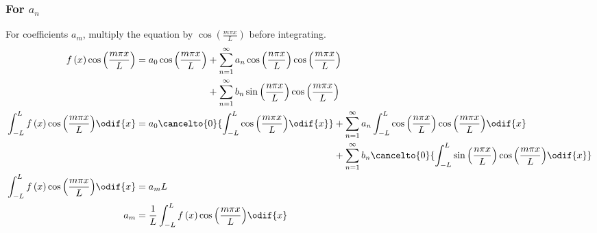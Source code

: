 \documentclass{article}
\begin{document}
\subsubsection{For \texorpdfstring{\(a_n\)}{an}}
For coefficients \(a_m\), multiply the equation by \(\cos{\left( \frac{m \pi x}{L} \right)}\) before integrating.
\begin{align*}
    f\left( x \right) \cos{\left( \frac{m \pi x}{L} \right)}                      & = \begin{aligned}[t]
                                                                                          a_0 \cos{\left( \frac{m \pi x}{L} \right)} & + \sum_{n = 1}^\infty a_n \cos{\left( \frac{n \pi x}{L} \right)} \cos{\left( \frac{m \pi x}{L} \right)} \\
                                                                                                                                     & + \sum_{n = 1}^\infty b_n \sin{\left( \frac{n \pi x}{L} \right)} \cos{\left( \frac{m \pi x}{L} \right)}
                                                                                      \end{aligned}                                                                                        \\
    \int_{-L}^L f\left( x \right) \cos{\left( \frac{m \pi x}{L} \right)} \odif{x} & = \begin{aligned}[t]
                                                                                          a_0 \cancelto{0}{\int_{-L}^L \cos{\left( \frac{m \pi x}{L} \right)} \odif{x}} & + \sum_{n = 1}^\infty a_n \int_{-L}^L \cos{\left( \frac{n \pi x}{L} \right)} \cos{\left( \frac{m \pi x}{L} \right)} \odif{x}               \\
                                                                                                                                                                        & + \sum_{n = 1}^\infty b_n \cancelto{0}{\int_{-L}^L \sin{\left( \frac{n \pi x}{L} \right)} \cos{\left( \frac{m \pi x}{L} \right)} \odif{x}}
                                                                                      \end{aligned} \\
    \int_{-L}^L f\left( x \right) \cos{\left( \frac{m \pi x}{L} \right)} \odif{x} & = a_m L                                                                                                                                                                                                                     \\
    a_m                                                                           & = \frac{1}{L} \int_{-L}^L f\left( x \right) \cos{\left( \frac{m \pi x}{L} \right)} \odif{x}
\end{align*}
\end{document}
